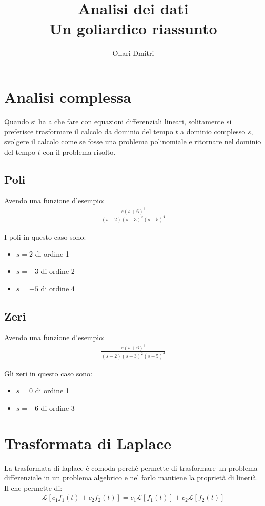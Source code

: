 \documentclass{article}
\title{Analisi dei dati \\[1ex] \large Un goliardico riassunto}
\author{Ollari Dmitri}
\begin{document}
    \maketitle
    

    \tableofcontents
    \listoffigures

    \newpage

\section{Analisi complessa}
Quando si ha a che fare con equazioni differenziali lineari, solitamente si preferisce trasformare il calcolo da dominio del tempo $t$ a dominio complesso $s$,
svolgere il calcolo come se fosse una problema polinomiale e ritornare nel dominio del tempo $t$ con il problema risolto.

\subsection{Poli}
Avendo una funzione d'esempio:
\begin{align}
  \frac{s(s+6)^3}{(s-2)(s+3)^2(s+5)^4}
\end{align}

I poli in questo caso sono:
\begin{itemize}
  \item $s = 2$ di ordine 1
  \item $s = -3$ di ordine 2
  \item $s = -5$ di ordine 4
\end{itemize}


\subsection{Zeri}
Avendo una funzione d'esempio:
\begin{align}
  \frac{s(s+6)^3}{(s-2)(s+3)^2(s+5)^4}
\end{align}

Gli zeri in questo caso sono:
\begin{itemize}
  \item $s = 0$ di ordine 1
  \item $s = -6$ di ordine 3
\end{itemize}

\section{Trasformata di Laplace}
La trasformata di laplace \`e comoda perch\`e permette di trasformare un problema differenziale in un problema algebrico e nel farlo mantiene la proprietà di linerià.
Il che permette di:
\begin{align}
  \mathcal{L}[c_1 f_1(t) + c_2 f_2(t)] = c_1 \mathcal{L}[f_1(t)] + c_2 \mathcal{L}[f_2(t)]
\end{align}
\end{document}
